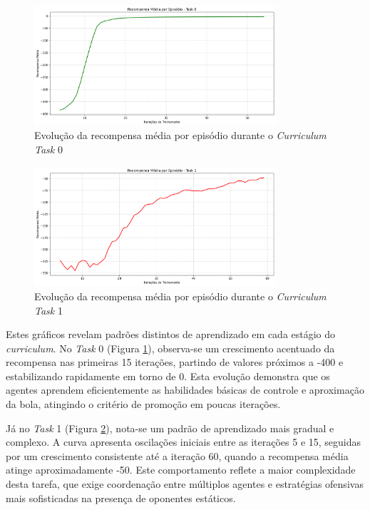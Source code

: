 \begin{figure}[H]
    \centering
    \includegraphics[width=0.8\textwidth]{fig/graficos_trabalho/graficos_experimentos/geral/recompensa_media_curriculum_task_0.png}
    \caption{Evolução da recompensa média por episódio durante o \textit{Curriculum Task} 0}
    \label{fig:reward_task0}
\end{figure}

\begin{figure}[H]
    \centering
    \includegraphics[width=0.8\textwidth]{fig/graficos_trabalho/graficos_experimentos/geral/recompensa_media_curriculum_task_1.png}
    \caption{Evolução da recompensa média por episódio durante o \textit{Curriculum Task} 1}
    \label{fig:reward_task1}
\end{figure}

Estes gráficos revelam padrões distintos de aprendizado em cada estágio do \textit{curriculum}. No \textit{Task} 0 (Figura \ref{fig:reward_task0}), observa-se um crescimento acentuado da recompensa nas primeiras 15 iterações, partindo de valores próximos a -400 e estabilizando rapidamente em torno de 0. Esta evolução demonstra que os agentes aprendem eficientemente as habilidades básicas de controle e aproximação da bola, atingindo o critério de promoção em poucas iterações.

Já no \textit{Task} 1 (Figura \ref{fig:reward_task1}), nota-se um padrão de aprendizado mais gradual e complexo. A curva apresenta oscilações iniciais entre as iterações 5 e 15, seguidas por um crescimento consistente até a iteração 60, quando a recompensa média atinge aproximadamente -50. Este comportamento reflete a maior complexidade desta tarefa, que exige coordenação entre múltiplos agentes e estratégias ofensivas mais sofisticadas na presença de oponentes estáticos.

